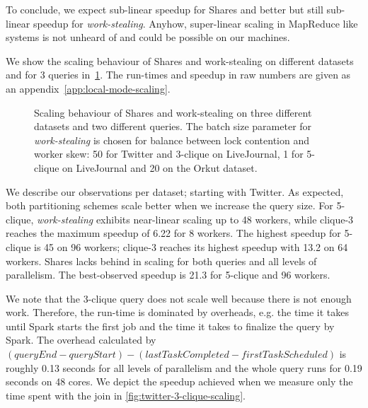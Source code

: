 To conclude, we expect sub-linear speedup for Shares and better but still sub-linear speedup for \textit{work-stealing}.
Anyhow, super-linear scaling in MapReduce like systems is not unheard of and could be possible on our machines.

We show the scaling behaviour of Shares and work-stealing on different datasets and for 3 queries in~\cref{fig:graphWCOJ-scaling}.
The run-times and speedup in raw numbers are given as an appendix~\cref{app:local-mode-scaling}.

\begin{figure}
    \centering
    \newline
    \caption{Scaling behaviour of Shares and work-stealing on three different datasets
    and two different queries.
    The batch size parameter for \textit{work-stealing} is chosen for balance between lock contention and worker skew:
    50 for Twitter and 3-clique on LiveJournal, 1 for 5-clique on LiveJournal and 20 on the Orkut dataset.
    }
    \label{fig:graphWCOJ-scaling}
\end{figure}

We describe our observations per dataset;
starting with Twitter.
As expected, both partitioning schemes scale better when we increase the query size.
For 5-clique, \textit{work-stealing} exhibits near-linear scaling up to 48 workers, while
clique-3 reaches the maximum speedup of 6.22 for 8 workers.
The highest speedup for 5-clique is 45 on 96 workers; clique-3 reaches its highest speedup
with 13.2 on 64 workers.
Shares lacks behind in scaling for both queries and all levels of parallelism.
The best-observed speedup is 21.3 for 5-clique and 96 workers.

We note that the 3-clique query does not scale well because there is not enough work.
Therefore, the run-time is dominated by overheads, e.g. the time it takes until Spark starts
the first job and the time it takes to finalize the query by Spark.
The overhead calculated by $(queryEnd - queryStart) - (lastTaskCompleted - firstTaskScheduled)$ is
roughly 0.13 seconds for all levels of parallelism and the whole query runs for 0.19 seconds on
48 cores.
We depict the speedup achieved when we measure only the time spent with the join in \cref{fig:twitter-3-clique-scaling}.

